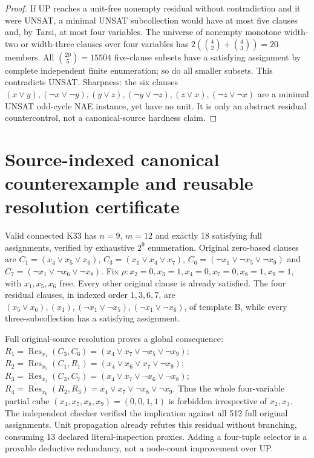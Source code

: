 \documentclass[11pt]{article}
\begin{document}
\begin{proof}
If UP reaches a unit-free nonempty residual without contradiction and it were UNSAT, a minimal UNSAT subcollection would have at most five clauses and, by Tarsi, at most four variables. The universe of nonempty monotone width-two or width-three clauses over four variables has $2(\binom42+\binom43)=20$ members. All $\binom{20}{5}=15504$ five-clause subsets have a satisfying assignment by complete independent finite enumeration; so do all smaller subsets. This contradicts UNSAT. Sharpness: the six clauses $(x\lor y),(\neg x\lor\neg y),(y\lor z),(\neg y\lor\neg z),(z\lor x),(\neg z\lor\neg x)$ are a minimal UNSAT odd-cycle NAE instance, yet have no unit. It is only an abstract residual countercontrol, not a canonical-source hardness claim.
\end{proof}

\section{Source-indexed canonical counterexample and reusable resolution certificate}
Valid connected K33 has $n=9$, $m=12$ and exactly 18 satisfying full assignments, verified by exhaustive $2^9$ enumeration. Original zero-based clauses are $C_1=(x_4\lor x_5\lor x_6)$, $C_3=(x_1\lor x_4\lor x_7)$, $C_6=(\neg x_1\lor\neg x_5\lor\neg x_9)$ and $C_7=(\neg x_1\lor\neg x_6\lor\neg x_8)$. Fix $\rho:x_2=0,x_3=1,x_4=0,x_7=0,x_8=1,x_9=1$, with $x_1,x_5,x_6$ free. Every other original clause is already satisfied. The four residual clauses, in indexed order $1,3,6,7$, are $(x_5\lor x_6),(x_1),(\neg x_1\lor\neg x_5),(\neg x_1\lor\neg x_6)$, of template B, while every three-subcollection has a satisfying assignment.

Full original-source resolution proves a global consequence: $R_1=\operatorname{Res}_{x_1}(C_3,C_6)=(x_4\lor x_7\lor\neg x_5\lor\neg x_9)$; $R_2=\operatorname{Res}_{x_5}(C_1,R_1)=(x_4\lor x_6\lor x_7\lor\neg x_9)$; $R_3=\operatorname{Res}_{x_1}(C_3,C_7)=(x_4\lor x_7\lor\neg x_6\lor\neg x_8)$; $R_4=\operatorname{Res}_{x_6}(R_2,R_3)=\boxed{x_4\lor x_7\lor\neg x_8\lor\neg x_9}$. Thus the whole four-variable partial cube $(x_4,x_7,x_8,x_9)=(0,0,1,1)$ is forbidden irrespective of $x_2,x_3$. The independent checker verified the implication against all 512 full original assignments. Unit propagation already refutes this residual without branching, consuming 13 declared literal-inspection proxies. Adding a four-tuple selector is a provable deductive redundancy, not a node-count improvement over UP.
\end{document}

